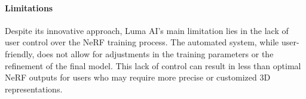 \paragraph{Limitations}
Despite its innovative approach, Luma AI's main limitation lies in the lack of user control over the NeRF training process. 
The automated system, while user-friendly, does not allow for adjustments in the training parameters or the refinement of the final model. 
This lack of control can result in less than optimal NeRF outputs for users who may require more precise or customized 3D representations.
